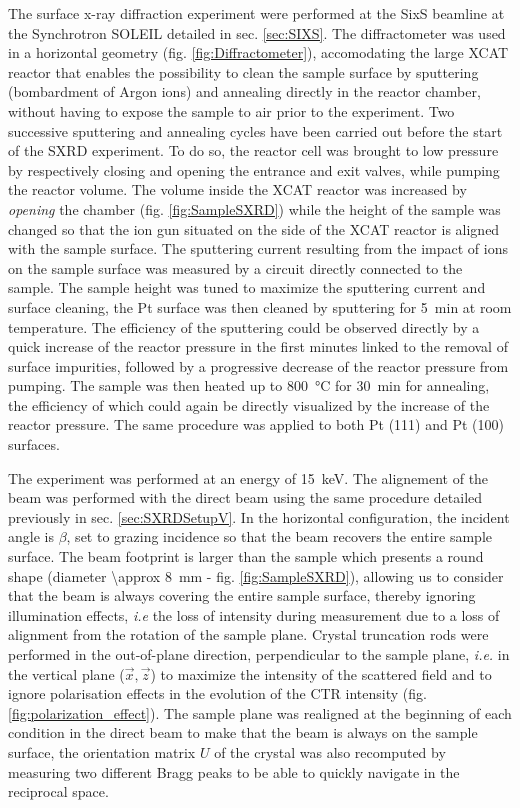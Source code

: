 The surface x-ray diffraction experiment were performed at the SixS beamline at the Synchrotron SOLEIL detailed in sec. \ref{sec:SIXS}.
The diffractometer was used in a horizontal geometry (fig. \ref{fig:Diffractometer}), accomodating the large XCAT reactor that enables the possibility to clean the sample surface by sputtering (bombardment of Argon ions) and annealing directly in the reactor chamber, without having to expose the sample to air prior to the experiment.
Two successive sputtering and annealing cycles have been carried out before the start of the SXRD experiment.
To do so, the reactor cell was brought to low pressure by respectively closing and opening the entrance and exit valves, while pumping the reactor volume.
The volume inside the XCAT reactor was increased by \textit{opening} the chamber (fig. \ref{fig:SampleSXRD}) while the height of the sample was changed so that the ion gun situated on the side of the XCAT reactor is aligned with the sample surface.
The sputtering current resulting from the impact of ions on the sample surface was measured by a circuit directly connected to the sample.
The sample height was tuned to maximize the sputtering current and surface cleaning, the Pt surface was then cleaned by sputtering for \qty{5}{\minute} at room temperature.
The efficiency of the sputtering could be observed directly by a quick increase of the reactor pressure in the first minutes linked to the removal of surface impurities, followed by a progressive decrease of the reactor pressure from pumping.
The sample was then heated up to \qty{800}{\degreeCelsius} for \qty{30}{\minute} for annealing, the efficiency of which could again be directly visualized by the increase of the reactor pressure.
The same procedure was applied to both Pt (111) and Pt (100) surfaces.

The experiment was performed at an energy of \qty{15}{\keV}.
The alignement of the beam was performed with the direct beam using the same procedure detailed previously in sec. \ref{sec:SXRDSetupV}.
In the horizontal configuration, the incident angle is $\beta$, set to grazing incidence so that the beam recovers the entire sample surface.
The beam footprint is larger than the sample which presents a round shape (diameter \qty{\approx 8}{\mm} - fig. \ref{fig:SampleSXRD}), allowing us to consider that the beam is always covering the entire sample surface, thereby ignoring illumination effects, \textit{i.e} the loss of intensity during measurement due to a loss of alignment from the rotation of the sample plane.
Crystal truncation rods were performed in the out-of-plane direction, perpendicular to the sample plane, \textit{i.e.} in the vertical plane ($\vec{x}, \vec{z}$) to maximize the intensity of the scattered field and to ignore polarisation effects in the evolution of the CTR intensity (fig. \ref{fig:polarization_effect}).
The sample plane was realigned at the beginning of each condition in the direct beam to make that the beam is always on the sample surface, the orientation matrix $U$ of the crystal \parencite{Schleputz2011} was also recomputed by measuring two different Bragg peaks to be able to quickly navigate in the reciprocal space.

